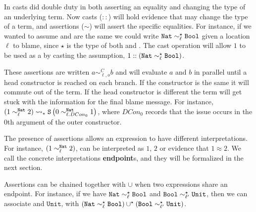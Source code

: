 
In  casts did double duty in both asserting an equality and changing the type of an underlying term.
Now casts ($::$) will hold evidence that may change the type of a term, and assertions ($\sim$) will assert the specific equalities.
For instance, if we wanted to assume \Nat{} and \Bool{} are the same we could write $\mathtt{Nat}{} \sim_{\ell}^{\star}\mathtt{Bool}{} $ given a location $\ell$ to blame, since $\star$ is the type of both \Nat{} and \Bool{}.
The cast operation will allow $1$ to be used as a \Bool{} by casting the assumption, $1::\left(\mathtt{Nat}{} \sim_{\ell}^{\star}\mathtt{Bool}{} \right)$. 

These assertions are written $a\sim_{\ell,o}^{C}b$ and will evaluate $a$ and $b$ in parallel until a head constructor is reached on each branch.
If the constructor is the same it will commute out of the term.
If the head constructor is different the term will get stuck with the information for the final blame message.
For instance, $\left(1 \sim_{\ell}^{\mathtt{Nat}{}} 2 \right)\rightsquigarrow_{*} \mathtt{S}{} \left(0 \sim_{\ell.DCon_{0}}^{\mathtt{Nat}{}} 1\right) $, where $DCon_{0}$ records that the issue occurs in the 0th argument of the outer \Suc{} constructor.


The presence of assertions allows an expression to have different interpretations.
For instance, $\left(1 \sim_{\ell}^{\mathtt{Nat}{}} 2 \right)$, can be interpreted as $1$, $2$ or evidence that $1\approx2$.
We call the concrete interpretations \textbf{endpoint}s, and they will be formalized in the next section.

Assertions can be chained together with $\cup$ when two expressions share an endpoint. %
For instance, if we have $\mathtt{Nat}{} \sim_{\ell}^{\star}\mathtt{Bool}{}$ and $\mathtt{Bool}{} \sim_{\ell'}^{\star}\mathtt{Unit}$, then we can associate \Nat{} and $\mathtt{Unit}$, with $\left(\mathtt{Nat}{} \sim_{\ell}^{\star}\mathtt{Bool}{} \right)\cup^{\star}\left(\mathtt{Bool}{} \sim_{\ell'}^{\star}\mathtt{Unit}\right)$.

